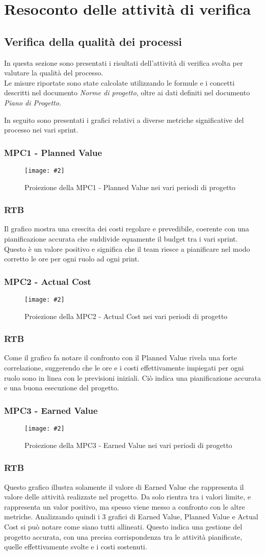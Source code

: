 \newcommand{\Met}[3]{
    \subsubsection{#1}
    \begin{figure}[h!] \centering
        \texttt{[image: \#2]}
        \caption{Proiezione della#1nei vari periodi di progetto}
    \end{figure}
    \subsubsection*{RTB}
    #3
    \newpage
}

\section{Resoconto delle attività di verifica}

\subsection{Verifica della qualità dei processi}
In questa sezione sono presentati i risultati dell'attività di verifica svolta per valutare la qualità del processo.\\
Le misure riportate sono state calcolate utilizzando le formule e i concetti descritti nel documento \textit{Norme di progetto}, oltre ai dati definiti nel documento \textit{Piano di Progetto}.

In seguito sono presentati i grafici relativi a diverse metriche significative del processo nei vari sprint.

\Met
{ %
    MPC1 - Planned Value
}
{ %
    template/images/PV.png
}
{ %
    Il grafico mostra una crescita dei costi regolare e prevedibile, coerente con una pianificazione accurata che suddivide equamente il budget tra i vari sprint.
    Questo è un valore positivo e significa che il team riesce a pianificare nel modo corretto le ore per ogni ruolo ad ogni print.
}

\Met
{ %
    MPC2 - Actual Cost
}
{ %
    template/images/AC.png
}
{ %
    Come il grafico fa notare il confronto con il Planned Value rivela una forte correlazione, suggerendo che le ore e i costi effettivamente impiegati per ogni ruolo sono in linea con le previsioni iniziali.
    Ciò indica una pianificazione accurata e una buona esecuzione del progetto.
}

\Met
{ %
    MPC3 - Earned Value
}
{ %
    template/images/EV.png
}
{ %
    Questo grafico illustra solamente il valore di Earned Value che rappresenta il valore delle attività realizzate nel progetto.
    Da solo rientra tra i valori limite, e rappresenta un valor positivo, ma spesso viene messo a confronto con le altre metriche.
    Analizzando quindi i 3 grafici di Earned Value, Planned Value e Actual Cost si può notare come siano tutti allineati. 
    Questo indica una gestione del progetto accurata, con una precisa corrispondenza tra le attività pianificate, quelle effettivamente svolte e i costi sostenuti.
}

